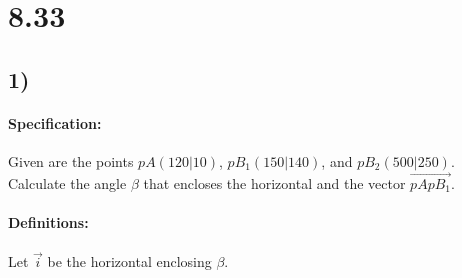 \documentclass{article}
\begin{document}
\section*{8.33}

\def\pAX{120}
\def\pAY{10}
\def\pBOneX{150}
\def\pBOneY{140}
\def\pBTwoX{500}
\def\pBTwoY{250}
\def\pA{$pA(\pAX|\pAY)$}
\def\pBOne{$pB_1(\pBOneX|\pBOneY)$}
\def\pBTwo{$pB_2(\pBTwoX|\pBTwoY)$}

\def\vA{\begin{pmatrix}
    \pAX \\  
    \pAY 
\end{pmatrix}}
\def\vBOne{\begin{pmatrix}
    \pBOneX \\  
    \pBOneY 
\end{pmatrix}}
\def\vBTwo{\begin{pmatrix}
    \pBTwoX \\  
    \pBTwoY 
\end{pmatrix}}

\subsection*{1)}

\def\vABX{\pgfmathparse{\pBOneX - \pAX}\pgfmathresult}
\def\vABY{\pgfmathparse{\pBOneY - \pAY}\pgfmathresult}
\def\vAB{\begin{pmatrix}
    \vABX \\ 
    \vABY 
\end{pmatrix}}

\def\vI{\begin{pmatrix}
    1 \\
    0
\end{pmatrix}}

\def\vH{\begin{pmatrix}
   121 \\
   10
\end{pmatrix}}

\paragraph{Specification:}
Given are the points \pA, \pBOne, and \pBTwo. Calculate the angle $\beta$ that encloses the 
horizontal and the vector $\vec{pApB_1}$.

\paragraph{Definitions:} 
Let $\vec{i}$ be the horizontal enclosing $\beta$.
\end{document}
